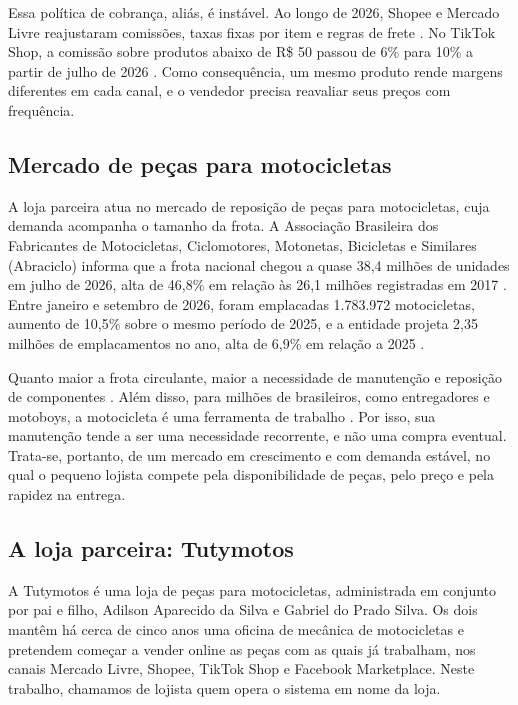 Essa política de cobrança, aliás, é instável. Ao longo de 2026, Shopee e Mercado Livre reajustaram comissões, taxas fixas por item e regras de frete \cite{gosmarter2026,prado2026}. No TikTok Shop, a comissão sobre produtos abaixo de R\$ 50 passou de 6\% para 10\% a partir de julho de 2026 \cite{tiktokshop2026,gobots2026}. Como consequência, um mesmo produto rende margens diferentes em cada canal, e o vendedor precisa reavaliar seus preços com frequência.

\subsection{Mercado de peças para motocicletas}

A loja parceira atua no mercado de reposição de peças para motocicletas, cuja demanda acompanha o tamanho da frota. A Associação Brasileira dos Fabricantes de Motocicletas, Ciclomotores, Motonetas, Bicicletas e Similares (Abraciclo) informa que a frota nacional chegou a quase 38,4 milhões de unidades em julho de 2026, alta de 46,8\% em relação às 26,1 milhões registradas em 2017 \cite{automotivebusiness2026}. Entre janeiro e setembro de 2026, foram emplacadas 1.783.972 motocicletas, aumento de 10,5\% sobre o mesmo período de 2025, e a entidade projeta 2,35 milhões de emplacamentos no ano, alta de 6,9\% em relação a 2025 \cite{montoia2026}.

Quanto maior a frota circulante, maior a necessidade de manutenção e reposição de componentes \cite{augusto2026}. Além disso, para milhões de brasileiros, como entregadores e motoboys, a motocicleta é uma ferramenta de trabalho \cite{maggion}. Por isso, sua manutenção tende a ser uma necessidade recorrente, e não uma compra eventual. Trata-se, portanto, de um mercado em crescimento e com demanda estável, no qual o pequeno lojista compete pela disponibilidade de peças, pelo preço e pela rapidez na entrega.

\subsection{A loja parceira: Tutymotos}

A Tutymotos é uma loja de peças para motocicletas, administrada em conjunto por pai e filho, Adilson Aparecido da Silva e Gabriel do Prado Silva. Os dois mantêm há cerca de cinco anos uma oficina de mecânica de motocicletas e pretendem começar a vender online as peças com as quais já trabalham, nos canais Mercado Livre, Shopee, TikTok Shop e Facebook Marketplace. Neste trabalho, chamamos de lojista quem opera o sistema em nome da loja.

